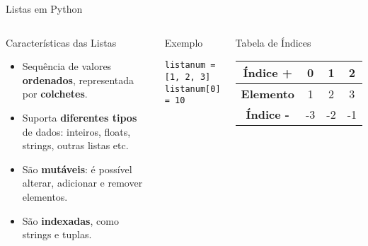 \begin{frame}[fragile]{Listas em Python}

    \begin{columns}[T]
        \begin{block}{Características das Listas}
            \begin{itemize}
                \item Sequência de valores \textbf{ordenados}, representada por \textbf{colchetes}.
                \item Suporta \textbf{diferentes tipos} de dados: inteiros, floats, strings, outras listas etc.
                \item São \textbf{mutáveis}: é possível alterar, adicionar e remover elementos.
                \item São \textbf{indexadas}, como strings e tuplas.
            \end{itemize}
        \end{block}

        \begin{block}{Exemplo}
            \begin{verbatim}
listanum = [1, 2, 3]
listanum[0] = 10
\end{verbatim}
        \end{block}

        \begin{exampleblock}{Tabela de Índices}
            \centering
            \begin{tabular}{|c|c|c|c|}
                \hline
                \textbf{Índice +} & 0  & 1  & 2  \\
                \hline
                \textbf{Elemento} & 1  & 2  & 3  \\
                \hline
                \textbf{Índice -} & -3 & -2 & -1 \\
                \hline
            \end{tabular}
        \end{exampleblock}
    \end{columns}

\end{frame}

